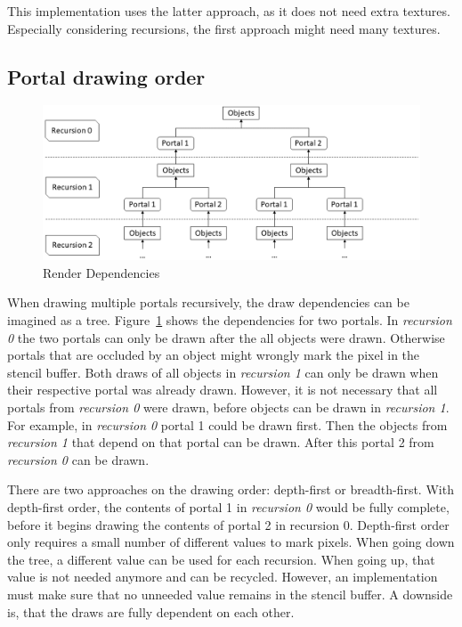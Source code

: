 
This implementation uses the latter approach, as it does not need extra textures. Especially considering recursions, the first approach might need many textures. 

\subsection{Portal drawing order}

\begin{figure}[h]
	\includegraphics[width=\linewidth]{images/rendertree.png}
	\caption{Render Dependencies}
	\label{fig:rendertree}
\end{figure}


When drawing multiple portals recursively, the draw dependencies can be imagined as a tree. Figure~\ref{fig:rendertree} shows the dependencies for two portals. In \textit{recursion 0} the two portals can only be drawn after the all objects were drawn. Otherwise portals that are occluded by an object might wrongly mark the pixel in the stencil buffer. Both draws of all objects in \textit{recursion 1} can only be drawn when their respective portal was already drawn. However, it is not necessary that all portals from \textit{recursion 0} were drawn, before objects can be drawn in \textit{recursion 1}. For example, in \textit{recursion 0} portal 1 could be drawn first. Then the objects from \textit{recursion 1} that depend on that portal can be drawn. After this portal 2 from \textit{recursion 0} can be drawn.

There are two approaches on the drawing order: depth-first or breadth-first. With depth-first order, the contents of portal 1 in \textit{recursion 0} would be fully complete, before it begins drawing the contents of portal 2 in recursion 0. Depth-first order only requires a small number of different values to mark pixels. When going down the tree, a different value can be used for each recursion. When going up, that value is not needed anymore and can be recycled. However, an implementation must make sure that no unneeded value remains in the stencil buffer. A downside is, that the draws are fully dependent on each other.

